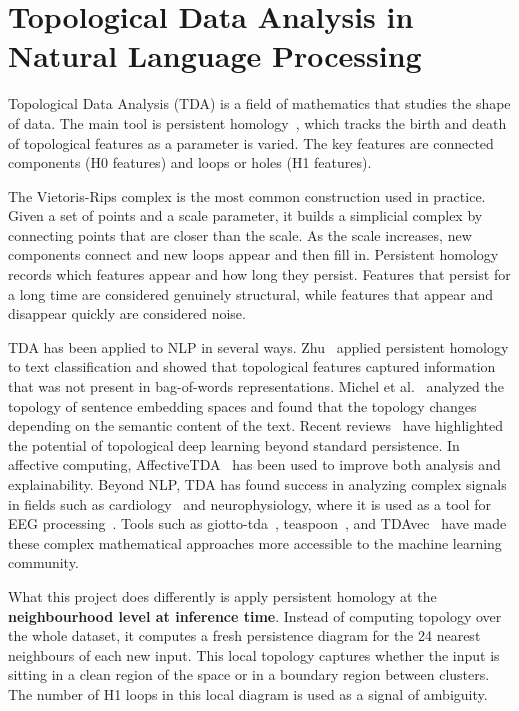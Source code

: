\section{Topological Data Analysis in Natural Language Processing}

Topological Data Analysis (TDA) is a field of mathematics that studies the shape of data. The
main tool is persistent homology~\cite{tda_foundation}, which tracks the birth and death of topological features as
a parameter is varied. The key features are connected components (H0 features) and loops or
holes (H1 features).

The Vietoris-Rips complex is the most common construction used in practice. Given a set of
points and a scale parameter, it builds a simplicial complex by connecting points that are closer
than the scale. As the scale increases, new components connect and new loops appear and then
fill in. Persistent homology records which features appear and how long they persist. Features
that persist for a long time are considered genuinely structural, while features that appear and
disappear quickly are considered noise.

TDA has been applied to NLP in several ways. Zhu~\cite{tda_nlp} applied persistent homology to text
classification and showed that topological features captured information that was not present in
bag-of-words representations. Michel et al.~\cite{embedding_geometry} analyzed the topology of sentence embedding
spaces and found that the topology changes depending on the semantic content of the text. Recent
reviews~\cite{tda_review} have highlighted the potential of topological deep learning beyond
standard persistence. In affective computing, AffectiveTDA~\cite{affective_tda} has been used
to improve both analysis and explainability. Beyond NLP, TDA has found success in analyzing
complex signals in fields such as cardiology~\cite{tda_cardio} and neurophysiology, where it is
used as a tool for EEG processing~\cite{tda_eeg}. Tools such as giotto-tda~\cite{giotto},
teaspoon~\cite{teaspoon}, and TDAvec~\cite{tdavec} have made these complex mathematical
approaches more accessible to the machine learning community.

What this project does differently is apply persistent homology at the \textbf{neighbourhood
level at inference time}. Instead of computing topology over the whole dataset, it computes a
fresh persistence diagram for the 24 nearest neighbours of each new input. This local topology
captures whether the input is sitting in a clean region of the space or in a boundary region
between clusters. The number of H1 loops in this local diagram is used as a signal of ambiguity.

